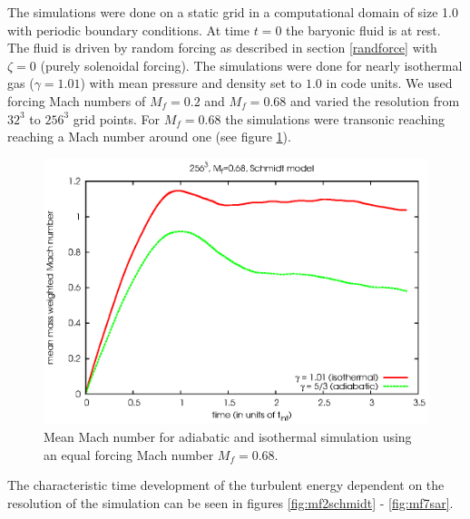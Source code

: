 The simulations were done on a static grid in a computational domain of size
1.0 with periodic boundary conditions. At
time $t=0$ the baryonic fluid is at rest. The fluid is driven by random forcing
as described in section \ref{randforce} with $\zeta = 0$ (purely solenoidal
forcing). The simulations were done for nearly isothermal gas
($\gamma=1.01$) with mean pressure and density set to $1.0$ in code units.
We used forcing Mach numbers of $M_f=0.2$ and $M_f=0.68$ and varied the
resolution from $32^3$ to $256^3$ grid points. For $M_f=0.68$ the simulations
were transonic reaching reaching a Mach number around one (see figure
\ref{fig:mach}).

\begin{figure}[tp]
\centering
\includegraphics[width=0.7\linewidth]{chapter7/mach2.eps}
\caption{Mean Mach number for adiabatic and isothermal simulation using an
equal
forcing Mach number $M_f=0.68$.}
\label{fig:mach}
\end{figure}

The characteristic time development of the turbulent energy dependent on the
resolution of the simulation can be seen in figures \ref{fig:mf2schmidt} -
\ref{fig:mf7sar}. 

